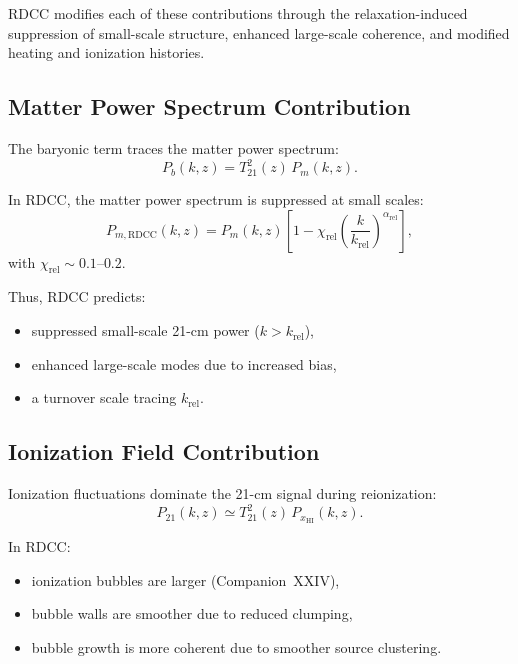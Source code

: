 \documentclass[11pt,a4paper]{article}
\begin{document}
RDCC modifies each of these contributions through the relaxation-induced suppression of
small-scale structure, enhanced large-scale coherence, and modified heating and ionization
histories.

\subsection{Matter Power Spectrum Contribution}

The baryonic term traces the matter power spectrum:
\begin{equation}
P_{b}(k,z)
=
T_{21}^{2}(z)\,
P_{m}(k,z).
\end{equation}

In RDCC, the matter power spectrum is suppressed at small scales:
\begin{equation}
P_{m,\mathrm{RDCC}}(k,z)
=
P_{m}(k,z)
\left[
1
-
\chi_{\mathrm{rel}}
\left(
\frac{k}{k_{\mathrm{rel}}}
\right)^{\alpha_{\mathrm{rel}}}
\right],
\end{equation}
with $\chi_{\mathrm{rel}} \sim 0.1$–$0.2$.

Thus, RDCC predicts:
\begin{itemize}
\item suppressed small-scale 21-cm power ($k > k_{\mathrm{rel}}$),
\item enhanced large-scale modes due to increased bias,
\item a turnover scale tracing $k_{\mathrm{rel}}$.
\end{itemize}

\subsection{Ionization Field Contribution}

Ionization fluctuations dominate the 21-cm signal during reionization:
\begin{equation}
P_{21}(k,z)
\simeq
T_{21}^{2}(z)\,
P_{x_{\mathrm{HI}}}(k,z).
\end{equation}

In RDCC:
\begin{itemize}
\item ionization bubbles are larger (Companion~XXIV),
\item bubble walls are smoother due to reduced clumping,
\item bubble growth is more coherent due to smoother source clustering.
\end{itemize}
\end{document}
